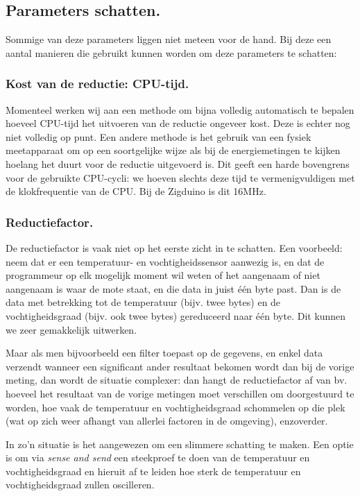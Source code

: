 \documentclass[11pt]{article}
\begin{document}
\subsection{Parameters schatten.} Sommige van deze parameters liggen niet meteen
voor de hand. Bij deze een aantal manieren die gebruikt kunnen worden om deze
parameters te schatten:

\subsubsection{Kost van de reductie: CPU-tijd.} Momenteel werken wij aan een
methode om bijna volledig automatisch te bepalen hoeveel CPU-tijd het uitvoeren
van de reductie ongeveer kost. Deze is echter nog niet volledig op punt. Een
andere methode is het gebruik van een fysiek meetapparaat om op een soortgelijke
wijze als bij de energiemetingen te kijken hoelang het duurt voor de reductie
uitgevoerd is. Dit geeft een harde bovengrens voor de gebruikte CPU-cycli: we
hoeven slechts deze tijd te vermenigvuldigen met de klokfrequentie van de
CPU. Bij de Zigduino is dit 16MHz.

\subsubsection{Reductiefactor.} De reductiefactor is vaak
niet op het eerste zicht in te schatten. Een voorbeeld: neem dat er een
temperatuur- en vochtigheidssensor aanwezig is, en dat de programmeur op elk mogelijk moment
 wil weten of het aangenaam of niet aangenaam is waar de mote staat, en die data
in juist één byte past. Dan is de data met betrekking tot de temperatuur (bijv.
twee bytes) en de vochtigheidsgraad (bijv. ook twee bytes) gereduceerd naar
\'e\'en byte. Dit kunnen we zeer gemakkelijk uitwerken.

Maar als men bijvoorbeeld een filter toepast op de gegevens, en enkel data
verzendt wanneer een significant ander resultaat bekomen wordt dan bij de vorige
meting, dan wordt de situatie complexer: dan hangt de reductiefactor af van bv.
hoeveel het resultaat van de vorige metingen moet verschillen om doorgestuurd te
worden, hoe vaak de temperatuur en vochtigheidsgraad schommelen op die plek (wat
op zich weer afhangt van allerlei factoren in de omgeving), enzoverder.

In zo'n situatie is het aangewezen om een slimmere schatting te maken. Een optie
is om via \textit{sense and send} een steekproef te doen van de temperatuur en
vochtigheidsgraad en hieruit af te leiden hoe sterk de temperatuur en
vochtigheidsgraad zullen oscilleren.
\end{document}
